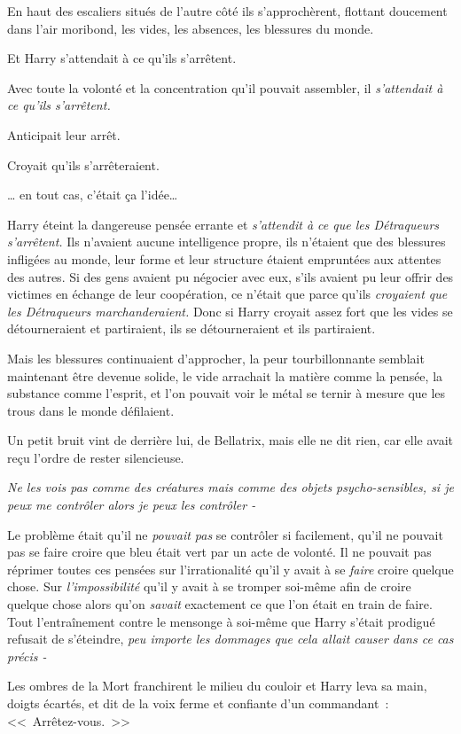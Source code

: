 En haut des escaliers situés de l'autre côté ils s'approchèrent, flottant doucement dans l'air moribond, les vides, les absences, les blessures du monde.

Et Harry s'attendait à ce qu'ils s'arrêtent.

Avec toute la volonté et la concentration qu'il pouvait assembler, il \emph{s'attendait à ce qu'ils s'arrêtent.}

Anticipait leur arrêt.

Croyait qu'ils s'arrêteraient.

… en tout cas, c'était ça l'idée…

Harry éteint la dangereuse pensée errante et \emph{s'attendit à ce que les Détraqueurs s'arrêtent.} Ils n'avaient aucune intelligence propre, ils n'étaient que des blessures infligées au monde, leur forme et leur structure étaient empruntées aux attentes des autres. Si des gens avaient pu négocier avec eux, s'ils avaient pu leur offrir des victimes en échange de leur coopération, ce n'était que parce qu'ils \emph{croyaient que les Détraqueurs marchanderaient.} Donc si Harry croyait assez fort que les vides se détourneraient et partiraient, ils se détourneraient et ils partiraient.

Mais les blessures continuaient d'approcher, la peur tourbillonnante semblait maintenant être devenue solide, le vide arrachait la matière comme la pensée, la substance comme l'esprit, et l'on pouvait voir le métal se ternir à mesure que les trous dans le monde défilaient.

Un petit bruit vint de derrière lui, de Bellatrix, mais elle ne dit rien, car elle avait reçu l'ordre de rester silencieuse.

\emph{Ne les vois pas comme des créatures mais comme des objets psycho-sensibles, si je peux me contrôler alors je peux les contrôler -}

Le problème était qu'il ne \emph{pouvait pas} se contrôler si facilement, qu'il ne pouvait pas se faire croire que bleu était vert par un acte de volonté. Il ne pouvait pas réprimer toutes ces pensées sur l'irrationalité qu'il y avait à se \emph{faire} croire quelque chose. Sur \emph{l'impossibilité} qu'il y avait à se tromper soi-même afin de croire quelque chose alors qu'on \emph{savait} exactement ce que l'on était en train de faire. Tout l'entraînement contre le mensonge à soi-même que Harry s'était prodigué refusait de s'éteindre, \emph{peu importe les dommages que cela allait causer dans ce cas précis -}

Les ombres de la Mort franchirent le milieu du couloir et Harry leva sa main, doigts écartés, et dit de la voix ferme et confiante d'un commandant~: <<~Arrêtez-vous.~>>

